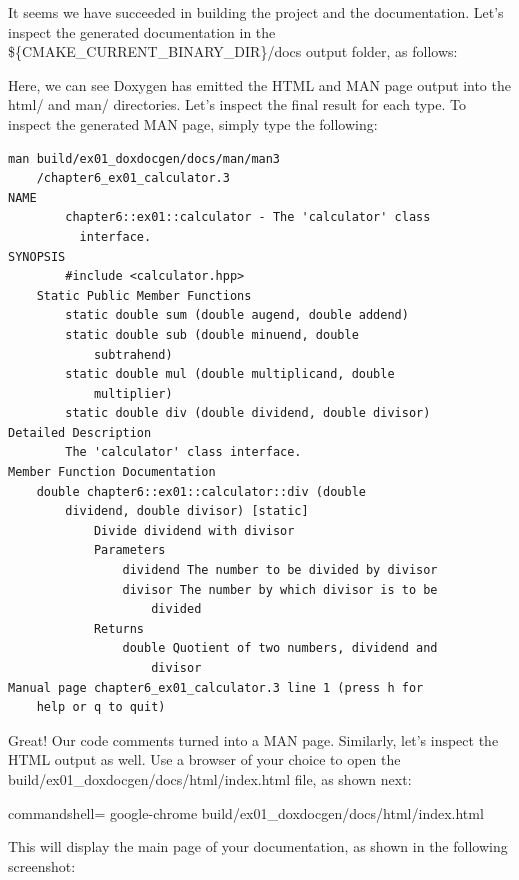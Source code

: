 It seems we have succeeded in building the project and the documentation. Let's inspect the generated documentation in the \$\{CMAKE\_CURRENT\_BINARY\_DIR\}/docs output folder, as follows:


Here, we can see Doxygen has emitted the HTML and MAN page output into the html/ and man/ directories. Let's inspect the final result for each type. To inspect the generated MAN page, simply type the following:

\begin{lstlisting}[style=styleCMake]
man build/ex01_doxdocgen/docs/man/man3
	/chapter6_ex01_calculator.3
NAME
		chapter6::ex01::calculator - The 'calculator' class
		  interface.
SYNOPSIS
		#include <calculator.hpp>
	Static Public Member Functions
		static double sum (double augend, double addend)
		static double sub (double minuend, double
			subtrahend)
		static double mul (double multiplicand, double
			multiplier)
		static double div (double dividend, double divisor)
Detailed Description
		The 'calculator' class interface.
Member Function Documentation
	double chapter6::ex01::calculator::div (double
		dividend, double divisor) [static]
			Divide dividend with divisor
			Parameters
				dividend The number to be divided by divisor
				divisor The number by which divisor is to be
					divided
			Returns
				double Quotient of two numbers, dividend and
					divisor
Manual page chapter6_ex01_calculator.3 line 1 (press h for
	help or q to quit)
\end{lstlisting}

Great! Our code comments turned into a MAN page. Similarly, let's inspect the HTML output as well. Use a browser of your choice to open the build/ex01\_doxdocgen/docs/html/index.html file, as shown next:

\begin{tcblisting}{commandshell={}}
google-chrome build/ex01_doxdocgen/docs/html/index.html
\end{tcblisting}

This will display the main page of your documentation, as shown in the following screenshot:

